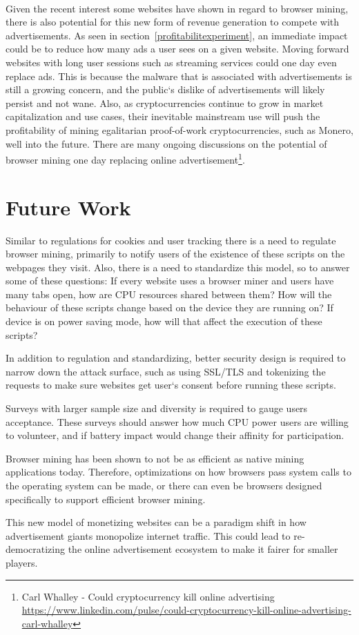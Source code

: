 \\
Given the recent interest some websites have shown in regard to browser mining, there is also potential for this new form of revenue generation to compete with advertisements. As seen in section~\ref{profitabilitexperiment}, an immediate impact could be to reduce how many ads a user sees on a given website. Moving forward websites with long user sessions such as streaming services could one day even replace ads. This is because the malware that is associated with advertisements is still a growing concern, and the public`s dislike of advertisements will likely persist and not wane. Also, as cryptocurrencies continue to grow in market capitalization and use cases, their inevitable mainstream use will push the profitability of mining egalitarian proof-of-work cryptocurrencies, such as Monero, well into the future. There are many ongoing discussions on the potential of browser mining one day replacing online advertisement\footnote{Carl Whalley - Could cryptocurrency kill online advertising \url{https://www.linkedin.com/pulse/could-cryptocurrency-kill-online-advertising-carl-whalley}}.

\section{Future Work}
Similar to regulations for cookies and user tracking there is a need to regulate browser mining, primarily to notify users of the existence of these scripts on the webpages they visit. Also, there is a need to standardize this model, so to answer some of these questions: If every website uses a browser miner and users have many tabs open, how are CPU resources shared between them? How will the behaviour of these scripts change based on the device they are running on? If device is on power saving mode, how will that affect the execution of these scripts?

In addition to regulation and standardizing, better security design is required to narrow down the attack surface, such as using SSL/TLS and tokenizing the requests to make sure websites get user`s consent before running these scripts. 

Surveys with larger sample size and diversity is required to gauge users acceptance. These surveys should answer how much CPU power users are willing to volunteer, and if battery impact would change their affinity for participation.

Browser mining has been shown to not be as efficient as native mining applications today. Therefore, optimizations on how browsers pass system calls to the operating system can be made, or there can even be browsers designed specifically to support efficient browser mining.

This new model of monetizing websites can be a paradigm shift in how advertisement giants monopolize internet traffic. This could lead to re-democratizing the online advertisement ecosystem to make it fairer for smaller players.



